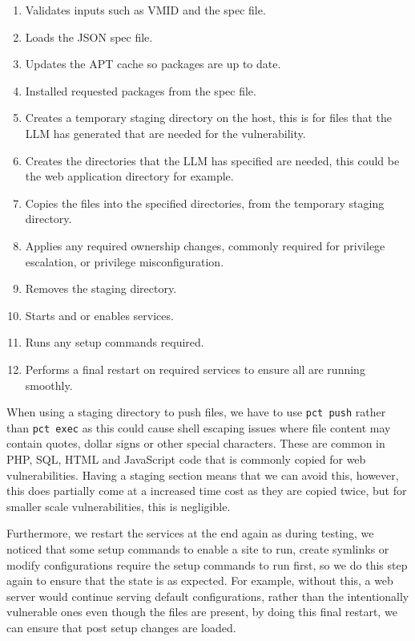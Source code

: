 \begin{enumerate}
	\item Validates inputs such as VMID and the spec file.
	\item Loads the JSON spec file.
	\item Updates the APT cache so packages are up to date.
	\item Installed requested packages from the spec file.
	\item Creates a temporary staging directory on the host, this is for files that the LLM has generated that are needed for the vulnerability.
	\item Creates the directories that the LLM has specified are needed, this could be the web application directory for example.
	\item Copies the files into the specified directories, from the temporary staging directory.
	\item Applies any required ownership changes, commonly required for privilege escalation, or privilege misconfiguration.
	\item Removes the staging directory.
	\item Starts and or enables services.
	\item Runs any setup commands required.
	\item Performs a final restart on required services to ensure all are running smoothly.
\end{enumerate}

When using a staging directory to push files, we have to use \lstinline{pct push} rather than \lstinline{pct exec} as this could cause shell escaping issues where file content may contain quotes, dollar signs or other special characters. These are common in PHP, SQL, HTML and JavaScript code that is commonly copied for web vulnerabilities. Having a staging section means that we can avoid this, however, this does partially come at a increased time cost as they are copied twice, but for smaller scale vulnerabilities, this is negligible.

Furthermore, we restart the services at the end again as during testing, we noticed that some setup commands to enable a site to run, create symlinks or modify configurations require the setup commands to run first, so we do this step again to ensure that the state is as expected. For example, without this, a web server would continue serving default configurations, rather than the intentionally vulnerable ones even though the files are present, by doing this final restart, we can ensure that post setup changes are loaded.

